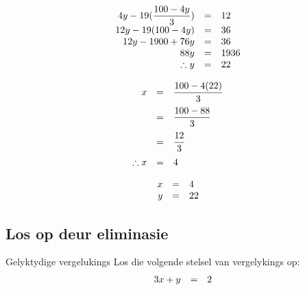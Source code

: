 \begin{aktiwiteit}{}
\begin{wex}
{
\begin{equation*}
    \begin{array}{ccl}\hfill 4y - 19(\dfrac{100 - 4y}{3})& =& 12\hfill \\
	\hfill 12y - 19(100 - 4y)  & =& 36\hfill \\
	\hfill 12y - 1900 + 76y & =& 36 \hfill \\
\hfill  88y& =& 1936 \hfill \\
\hfill \therefore y& =& 22 \hfill
    \end{array}
\end{equation*}

\begin{equation*}
    \begin{array}{ccl}\hfill x &=& \dfrac{100 - 4(22)}{3}\hfill \vspace{6pt}\\
	\hfill & =& \dfrac{100-88}{3}\hfill \vspace{6pt}\\
	\hfill & =& \dfrac{12}{3}\hfill\vspace{6pt} \\
	\hfill \therefore x&=& 4 \hfill 
    \end{array}
\end{equation*}


\begin{equation*}
\begin{array}{ccc}
 \hfill x& =& 4\hfill \\
\hfill y& =& 22\hfill 
\end{array}
\end{equation*}
}
\end{wex}

\subsection*{Los op deur eliminasie}

\begin{wex}
{Gelyktydige vergelukings}
{
Los die volgende stelsel van vergelykings op:
\begin{equation*}
\begin{array}{ccll}\hfill & 3x+y& =& 2\hfill \\ 


\end{array}
\end{equation*}}
\end{wex}
\end{aktiwiteit}

